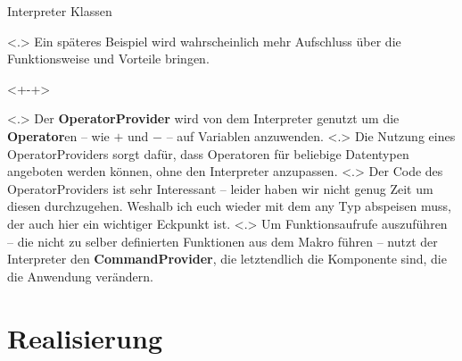 \begin{frame}{Interpreter Klassen}
\begin{uncoverenv}
          \note[item]<.>{
            Ein späteres Beispiel wird wahrscheinlich mehr Aufschluss über die Funktionsweise und Vorteile bringen.
          }
    \end{uncoverenv}
    \begin{uncoverenv}<+-+>%
          \note[item]<.>{
            Der \textbf{OperatorProvider} wird von dem Interpreter genutzt um die \textbf{Operator}en -- wie $+$ und $-$ -- auf Variablen anzuwenden.
          }
          \note[item]<.>{
            Die Nutzung eines OperatorProviders sorgt dafür, dass Operatoren für beliebige Datentypen angeboten werden können, ohne den Interpreter anzupassen.
          }
          \note[item]<.>{
            Der Code des OperatorProviders ist sehr Interessant -- leider haben wir nicht genug Zeit um diesen durchzugehen. Weshalb ich euch wieder mit dem any Typ abspeisen muss, der auch hier ein wichtiger Eckpunkt ist.
          }
          \note[item]<.>{
            Um Funktionsaufrufe auszuführen -- die nicht zu selber definierten Funktionen aus dem Makro führen -- nutzt der Interpreter den \textbf{CommandProvider}, die letztendlich die Komponente sind, die die Anwendung verändern.
          }
    \end{uncoverenv}
  \end{frame}

\section{Realisierung}

